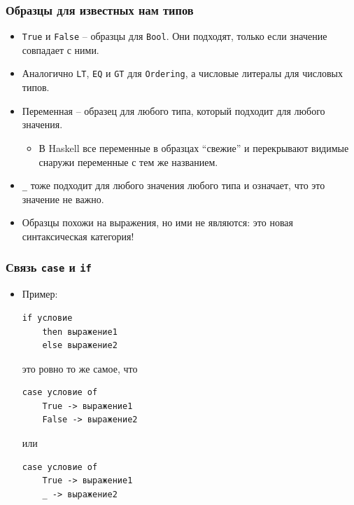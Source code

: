 \documentclass[11pt]{beamer}
\begin{document}
\begin{frame}[fragile]
\frametitle{Образцы для известных нам типов}
\begin{itemize}
    \item \lstinline|True| и \lstinline|False| -- образцы для \lstinline|Bool|. Они подходят, только если значение совпадает с ними. 
    \item Аналогично \lstinline|LT|, \lstinline|EQ| и \lstinline|GT| для \lstinline|Ordering|, а числовые литералы для числовых типов.
    \item Переменная -- образец для любого типа, который подходит для любого значения.
    \begin{itemize}
        \item В Haskell все переменные в образцах \enquote{свежие} и перекрывают видимые снаружи переменные с тем же названием.
    \end{itemize}
\item \lstinline|_| тоже подходит для любого значения любого типа и означает, что это значение не важно.
    \item Образцы похожи на выражения, но ими не являются: это новая синтаксическая категория!
\end{itemize}
\end{frame}

\begin{frame}[fragile]
\frametitle{Связь \lstinline[basicstyle=\ttfamily]|case| и \lstinline[basicstyle=\ttfamily]|if|}
\begin{itemize}
    \item Пример:
\begin{lstlisting}
if условие 
    then выражение1 
    else выражение2
\end{lstlisting}
это ровно то же самое, что
\begin{lstlisting}
case условие of
    True -> выражение1 
    False -> выражение2
\end{lstlisting}
или
\begin{lstlisting}
case условие of
    True -> выражение1 
    _ -> выражение2
\end{lstlisting}
\end{itemize}
\end{frame}
\end{document}
